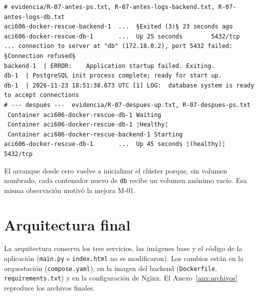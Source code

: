 \documentclass[11pt,a4paper]{article}
\newcommand{\cod}[1]{\texttt{#1}}
\begin{document}
\begin{lstlisting}
# evidencia/R-07-antes-ps.txt, R-07-antes-logs-backend.txt, R-07-antes-logs-db.txt
aci606-docker-rescue-backend-1  ...  §Exited (3)§ 23 seconds ago
aci606-docker-rescue-db-1       ...  Up 25 seconds        5432/tcp
... connection to server at "db" (172.18.0.2), port 5432 failed: §Connection refused§
backend-1  | ERROR:    Application startup failed. Exiting.
db-1  | PostgreSQL init process complete; ready for start up.
db-1  | 2026-11-23 18:51:38.673 UTC [1] LOG:  database system is ready to accept connections
# --- después ---  evidencia/R-07-despues-up.txt, R-07-despues-ps.txt
 Container aci606-docker-rescue-db-1 Waiting
 Container aci606-docker-rescue-db-1 ¦Healthy¦
 Container aci606-docker-rescue-backend-1 Starting
aci606-docker-rescue-db-1       ...  Up 45 seconds ¦(healthy)¦   5432/tcp
\end{lstlisting}
{\footnotesize *El arranque desde cero vuelve a inicializar el clúster porque, sin volumen nombrado, cada contenedor nuevo de \cod{db} recibe un volumen anónimo vacío. Esa misma observación motivó la mejora M-01.\par}

\section{Arquitectura final}

La arquitectura conserva los tres servicios, las imágenes base y el código de la aplicación (\cod{main.py} e \cod{index.html} no se modificaron). Los cambios están en la orquestación (\cod{compose.yaml}), en la imagen del backend (\cod{Dockerfile}, \cod{requirements.txt}) y en la configuración de Nginx. El Anexo~\ref{anx:archivos} reproduce los archivos finales.
\end{document}
